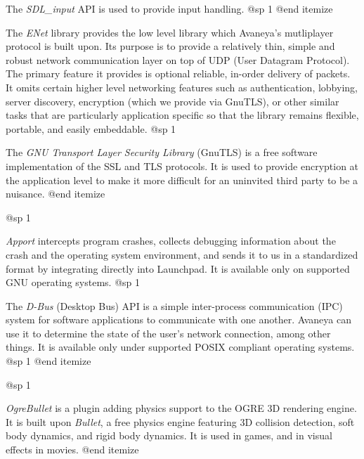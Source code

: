 \item
The {\it SDL_input} API is used to provide input handling.
@sp 1
@end itemize


\itemize
\item
The {\it ENet} library provides the low level library which Avaneya's mutliplayer protocol is built upon. Its purpose is to provide a relatively thin, simple and robust network communication layer on top of UDP (User Datagram Protocol). The primary feature it provides is optional reliable, in-order delivery of packets. It omits certain higher level networking features such as authentication, lobbying, server discovery, encryption (which we provide via GnuTLS), or other similar tasks that are particularly application specific so that the library remains flexible, portable, and easily embeddable.
@sp 1

\item
The {\it GNU Transport Layer Security Library} (GnuTLS) is a free software implementation of the SSL and TLS protocols. It is used to provide encryption at the application level to make it more difficult for an uninvited third party to be a nuisance.
@end itemize

@sp 1

\itemize
\item
{\it Apport} intercepts program crashes, collects debugging information about the crash and the operating system environment, and sends it to us in a standardized format by integrating directly into Launchpad. It is available only on supported GNU operating systems.
@sp 1

\item
The {\it D-Bus} (Desktop Bus) API is a simple inter-process communication (IPC) system for software applications to communicate with one another. Avaneya can use it to determine the state of the user's network connection, among other things. It is available only under supported POSIX compliant operating systems.
@sp 1
@end itemize

@sp 1

\itemize
\item
{\it OgreBullet} is a plugin adding physics support to the OGRE 3D rendering engine. It is built upon {\it Bullet}, a free physics engine featuring 3D collision detection, soft body dynamics, and rigid body dynamics. It is used in games, and in visual effects in movies.
@end itemize



